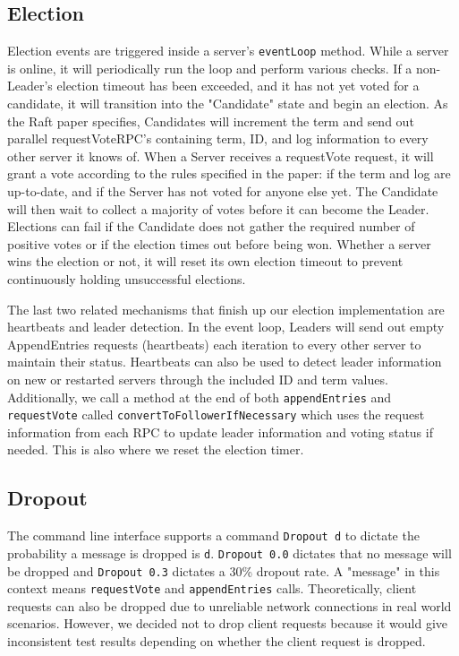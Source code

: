 \documentclass[letterpaper,twocolumn,10pt]{article}
\begin{document}
\subsection{Election}
Election events are triggered inside a server's \texttt{eventLoop} method. While a server is online, it will periodically run the loop and perform various checks. If a non-Leader's election timeout has been exceeded, and it has not yet voted for a candidate, it will transition into the "Candidate" state and begin an election. As the Raft paper specifies, Candidates will increment the term and send out parallel requestVoteRPC's containing term, ID, and log information to every other server it knows of. When a Server receives a requestVote request, it will grant a vote according to the rules specified in the paper: if the term and log are up-to-date, and if the Server has not voted for anyone else yet. The Candidate will then wait to collect a majority of votes before it can become the Leader. Elections can fail if the Candidate does not gather the required number of positive votes or if the election times out before being won. Whether a server wins the election or not, it will reset its own election timeout to prevent continuously holding unsuccessful elections.

The last two related mechanisms that finish up our election implementation are heartbeats and leader detection. In the event loop, Leaders will send out empty AppendEntries requests (heartbeats) each iteration to every other server to maintain their status. Heartbeats can also be used to detect leader information on new or restarted servers through the included ID and term values. Additionally, we call a method at the end of both \texttt{appendEntries} and \texttt{requestVote} called \texttt{convertToFollowerIfNecessary} which uses the request information from each RPC to update leader information and voting status if needed. This is also where we reset the election timer.

\subsection{Dropout}
The command line interface supports a command \texttt{Dropout d} to dictate the probability a message is dropped is \texttt{d}. \texttt{Dropout 0.0} dictates that no message will be dropped and \texttt{Dropout 0.3} dictates a 30\% dropout rate. A "message" in this context means \texttt{requestVote} and \texttt{appendEntries} calls. Theoretically, client requests can also be dropped due to unreliable network connections in real world scenarios. However, we decided not to drop client requests because it would give inconsistent test results depending on whether the client request is dropped. 
\end{document}
